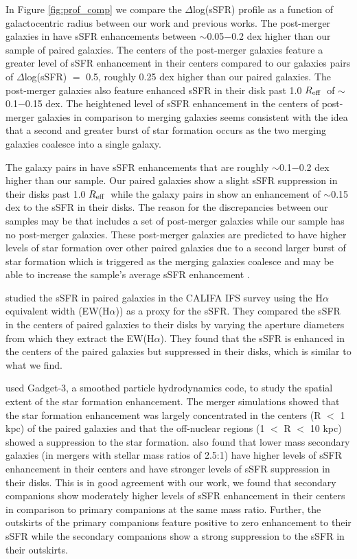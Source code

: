 \documentclass[iop,revtex4,twocolumn,apj,numberedappendix,appendixfloats]{emulateapj}
\newcommand{\reff}{$R_{\rm eff}$}
\newcommand{\ewha}{EW(H$\alpha$)}
\begin{document}
In Figure \ref{fig:prof_comp} we compare the $\Delta$log(sSFR) profile as a function of galactocentric radius between our work and previous works. The post-merger galaxies in \citet{Thorp:2019} have sSFR enhancements between $\sim$0.05$-$0.2 dex higher than our sample of paired galaxies. The centers of the post-merger galaxies feature a greater level of sSFR enhancement in their centers compared to our galaxies pairs of $\Delta$log(sSFR) $=$ 0.5, roughly 0.25 dex higher than our paired galaxies. The post-merger galaxies also feature enhanced sSFR in their disk past 1.0 \reff\ of $\sim$0.1$-$0.15 dex. The heightened level of sSFR enhancement in the centers of post-merger galaxies in comparison to merging galaxies seems consistent with the idea that a second and greater burst of star formation occurs as the two merging galaxies coalesce into a single galaxy. 

The galaxy pairs in \citet{Pan:2019} have sSFR enhancements that are roughly $\sim$0.1$-$0.2 dex higher than our sample. Our paired galaxies show a slight sSFR suppression in their disks past 1.0 \reff\ while the galaxy pairs in \citet{Pan:2019} show an enhancement of $\sim$0.15 dex to the sSFR in their disks. The reason for the discrepancies between our samples may be that \citet{Pan:2019} includes a set of post-merger galaxies while our sample has no post-merger galaxies. These post-merger galaxies are predicted to have higher levels of star formation over other paired galaxies due to a second larger burst of star formation which is triggered as the merging galaxies coalesce and may be able to increase the sample's average sSFR enhancement . 

\citet{Barrera-Ballesteros:2015} studied the sSFR in paired galaxies in the CALIFA IFS survey using the H$\alpha$ equivalent width (\ewha) as a proxy for the sSFR. They compared the sSFR in the centers of paired galaxies to their disks by varying the aperture diameters from which they extract the \ewha. They found that the sSFR is enhanced in the centers of the paired galaxies but suppressed in their disks, which is similar to what we find.  

\citet{Moreno:2015} used {\sc Gadget}-3, a smoothed particle hydrodynamics code, to study the spatial extent of the star formation enhancement. The merger simulations showed that the star formation enhancement was largely concentrated in the centers (R $<$ 1 kpc) of the paired galaxies and that the off-nuclear regions (1 $<$ R $<$ 10 kpc) showed a suppression to the star formation. \citet{Moreno:2015} also found that lower mass secondary galaxies (in mergers with stellar mass ratios of 2.5:1) have higher levels of sSFR enhancement in their centers and have stronger levels of sSFR suppression in their disks. This is in good agreement with our work, we found that secondary companions show moderately higher levels of sSFR enhancement in their centers in comparison to primary companions at the same mass ratio. Further, the outskirts of the primary companions feature positive to zero enhancement to their sSFR while the secondary companions show a strong suppression to the sSFR in their outskirts. 
\end{document}
